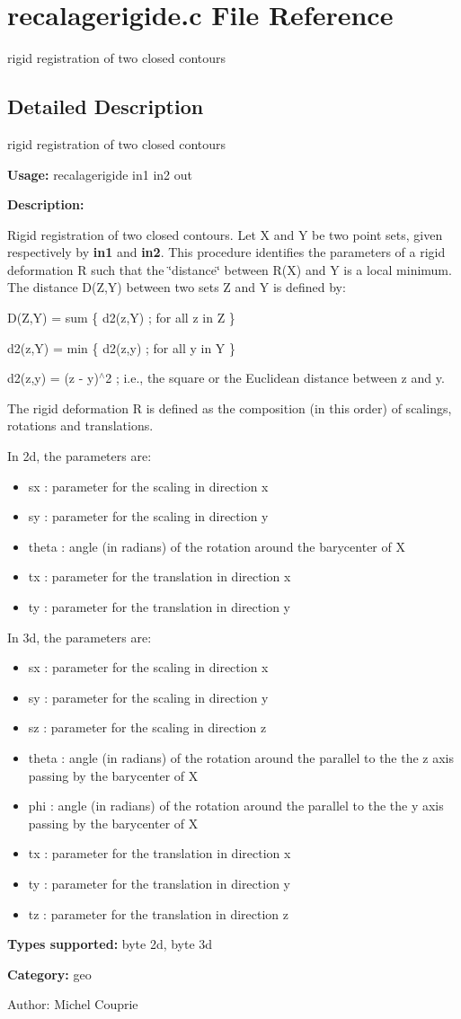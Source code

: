 \section{recalagerigide.c File Reference}
\label{recalagerigide_8c}
rigid registration of two closed contours 



\subsection{Detailed Description}
rigid registration of two closed contours 

{\bf Usage:} recalagerigide in1 in2 out

{\bf Description:}

Rigid registration of two closed contours. Let X and Y be two point sets, given respectively by {\bf in1} and {\bf in2}. This procedure identifies the parameters of a rigid deformation R such that the \char`\"{}distance\char`\"{} between R(X) and Y is a local minimum. The distance D(Z,Y) between two sets Z and Y is defined by:

D(Z,Y) = sum \{ d2(z,Y) ; for all z in Z \}

d2(z,Y) = min \{ d2(z,y) ; for all y in Y \}

d2(z,y) = (z - y)$^\wedge$2 ; i.e., the square or the Euclidean distance between z and y.

The rigid deformation R is defined as the composition (in this order) of scalings, rotations and translations.

In 2d, the parameters are: \begin{itemize}
\item sx : parameter for the scaling in direction x \item sy : parameter for the scaling in direction y \item theta : angle (in radians) of the rotation around the barycenter of X \item tx : parameter for the translation in direction x \item ty : parameter for the translation in direction y\end{itemize}
In 3d, the parameters are: \begin{itemize}
\item sx : parameter for the scaling in direction x \item sy : parameter for the scaling in direction y \item sz : parameter for the scaling in direction z \item theta : angle (in radians) of the rotation around the parallel to the the z axis passing by the barycenter of X \item phi : angle (in radians) of the rotation around the parallel to the the y axis passing by the barycenter of X \item tx : parameter for the translation in direction x \item ty : parameter for the translation in direction y \item tz : parameter for the translation in direction z\end{itemize}
{\bf Types supported:} byte 2d, byte 3d

{\bf Category:} geo

\begin{Desc}
\item[Author:]Michel Couprie \end{Desc}
